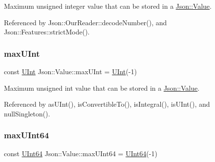 Maximum unsigned integer value that can be stored in a \hyperlink{classJson_1_1Value}{Json\+::\+Value}. 



Referenced by Json\+::\+Our\+Reader\+::decode\+Number(), and Json\+::\+Features\+::strict\+Mode().

\mbox{\label{classJson_1_1Value_ac79e63ee68d3aa914bfd6988be669b87_ac79e63ee68d3aa914bfd6988be669b87}} 
\subsubsection{\texorpdfstring{max\+U\+Int}{maxUInt}}
{\footnotesize\ttfamily const \hyperlink{classJson_1_1Value_a0933d59b45793ae4aade1757c322a98d_a0933d59b45793ae4aade1757c322a98d}{U\+Int} Json\+::\+Value\+::max\+U\+Int = \hyperlink{classJson_1_1Value_a0933d59b45793ae4aade1757c322a98d_a0933d59b45793ae4aade1757c322a98d}{U\+Int}(-\/1)\hspace{0.3cm}{\ttfamily [static]}}



Maximum unsigned int value that can be stored in a \hyperlink{classJson_1_1Value}{Json\+::\+Value}. 



Referenced by as\+U\+Int(), is\+Convertible\+To(), is\+Integral(), is\+U\+Int(), and null\+Singleton().

\mbox{\label{classJson_1_1Value_ae1eb89c305c39516696ff305cffa01da_ae1eb89c305c39516696ff305cffa01da}} 
\subsubsection{\texorpdfstring{max\+U\+Int64}{maxUInt64}}
{\footnotesize\ttfamily const \hyperlink{classJson_1_1Value_a8b62564be8c087c6d18de180ff4e13e3_a8b62564be8c087c6d18de180ff4e13e3}{U\+Int64} Json\+::\+Value\+::max\+U\+Int64 = \hyperlink{classJson_1_1Value_a8b62564be8c087c6d18de180ff4e13e3_a8b62564be8c087c6d18de180ff4e13e3}{U\+Int64}(-\/1)\hspace{0.3cm}{\ttfamily [static]}}



